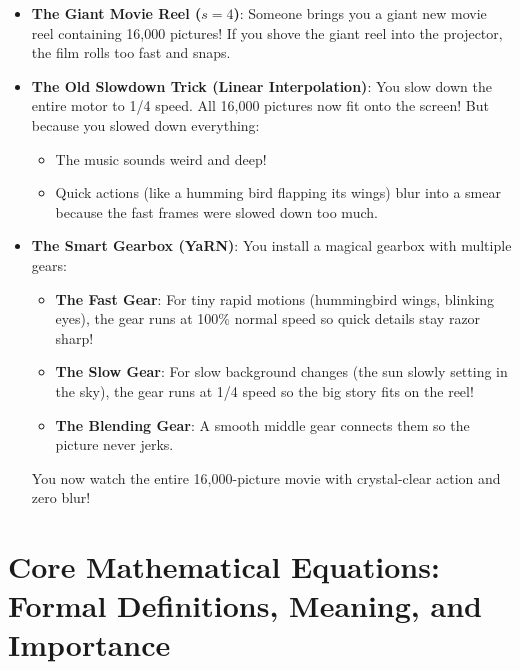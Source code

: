 \documentclass[11pt,a4paper]{article}
\theoremstyle{definition}
\begin{document}
\begin{itemize}
    \item \textbf{The Giant Movie Reel ($s = 4$)}:
    Someone brings you a giant new movie reel containing 16,000 pictures! If you shove the giant reel into the projector, the film rolls too fast and snaps.
    
    \item \textbf{The Old Slowdown Trick (Linear Interpolation)}:
    You slow down the entire motor to 1/4 speed. All 16,000 pictures now fit onto the screen! But because you slowed down everything:
    \begin{itemize}
        \item The music sounds weird and deep!
        \item Quick actions (like a humming bird flapping its wings) blur into a smear because the fast frames were slowed down too much.
    \end{itemize}
    
    \item \textbf{The Smart Gearbox (YaRN)}:
    You install a magical gearbox with multiple gears:
    \begin{itemize}
        \item \textbf{The Fast Gear}: For tiny rapid motions (hummingbird wings, blinking eyes), the gear runs at 100\% normal speed so quick details stay razor sharp!
        \item \textbf{The Slow Gear}: For slow background changes (the sun slowly setting in the sky), the gear runs at 1/4 speed so the big story fits on the reel!
        \item \textbf{The Blending Gear}: A smooth middle gear connects them so the picture never jerks.
    \end{itemize}
    You now watch the entire 16,000-picture movie with crystal-clear action and zero blur!
\end{itemize}

\section{Core Mathematical Equations: Formal Definitions, Meaning, and Importance}
\end{document}
